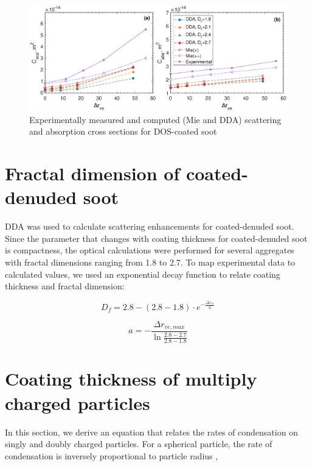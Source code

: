 \documentclass[12pt]{article}
\begin{document}
\begin{figure}[htp]
\centering
\includegraphics[width=\textwidth]{images/absolute-optics-modeling.eps}
\caption{Experimentally measured and computed (Mie and DDA) scattering and absorption cross sections for DOS-coated soot}
\label{s:fig:dda}
\end{figure}

\section{Fractal dimension of coated-denuded soot}
\label{s:sec:drve2df}

DDA was used to calculate scattering enhancements for coated-denuded soot. Since the parameter that changes with coating thickness for coated-denuded soot is compactness, the optical calculations were performed for several aggregates with fractal dimensions ranging from 1.8 to 2.7. To map experimental data to calculated values, we used an exponential decay function to relate coating thickness and fractal dimension:

\begin{equation}
    D_f=2.8-(2.8-1.8)\cdot e^{-\frac{\Delta r_{ve}}{a}}
\end{equation}

\begin{equation}
    a=-\frac{\Delta r_{ve,max}}{\ln{\frac{2.8-2.7}{2.8-1.8}}}
\end{equation}

\section{Coating thickness of multiply charged particles}
\label{s:sec:drve_multiply_charged}

In this section, we derive an equation that relates the rates of condensation on singly and doubly charged particles. For a spherical particle, the rate of condensation is inversely proportional to particle radius \citep{RN2},
\end{document}
